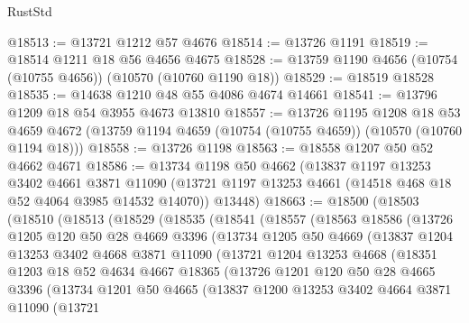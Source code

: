 \begin{lexlean}{RustStd}
\begin{coremodule}
@18513 := @13721 @1212 @57 @4676
@18514 := @13726 @1191
@18519 := @18514 @1211 @18 @56 @4656 @4675
@18528 := @13759 @1190 @4656 (@10754 (@10755 @4656)) (@10570 (@10760 @1190 @18))
@18529 := @18519 @18528
@18535 := @14638 @1210 @48 @55 @4086 @4674 @14661
@18541 := @13796 @1209 @18 @54 @3955 @4673 @13810
@18557 := @13726
    @1195
    @1208
    @18
    @53
    @4659
    @4672
    (@13759 @1194 @4659 (@10754 (@10755 @4659)) (@10570 (@10760 @1194 @18)))
@18558 := @13726 @1198
@18563 := @18558 @1207 @50 @52 @4662 @4671
@18586 := @13734
    @1198
    @50
    @4662
    (@13837
      @1197
      @13253
      @3402
      @4661
      @3871
      @11090
      (@13721 @1197 @13253 @4661 (@14518 @468 @18 @52 @4064 @3985 @14532 @14070))
      @13448)
@18663 := @18500
    (@18503
      (@18510
        (@18513
          (@18529
            (@18535
              (@18541
                (@18557
                  (@18563
                    @18586
                    (@13726
                      @1205
                      @120
                      @50
                      @28
                      @4669
                      @3396
                      (@13734
                        @1205
                        @50
                        @4669
                        (@13837
                          @1204
                          @13253
                          @3402
                          @4668
                          @3871
                          @11090
                          (@13721
                            @1204
                            @13253
                            @4668
                            (@18351
                              @1203
                              @18
                              @52
                              @4634
                              @4667
                              @18365
                              (@13726
                                @1201
                                @120
                                @50
                                @28
                                @4665
                                @3396
                                (@13734
                                  @1201
                                  @50
                                  @4665
                                  (@13837
                                    @1200
                                    @13253
                                    @3402
                                    @4664
                                    @3871
                                    @11090
                                    (@13721

\end{coremodule}
\end{lexlean}
